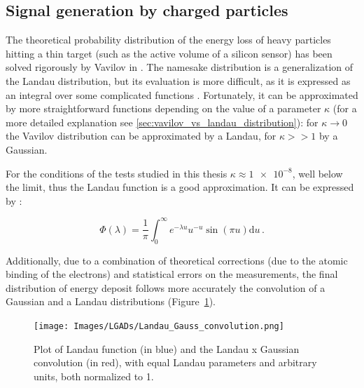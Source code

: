 \subsection{Signal generation by charged particles}\label{subsec:charged_particles_distribution}
The theoretical probability distribution of the energy loss of heavy particles hitting a thin target (such as the active volume of a silicon sensor) has been solved rigorously by Vavilov in \cite{vavilov_1957}. The namesake distribution is a generalization of the Landau distribution, but its evaluation is more difficult, as it is expressed as an integral over some complicated functions \cite[Eq.(4)]{vavilov_1957}. Fortunately, it can be approximated by more straightforward functions depending on the value of a parameter $\kappa$ (for a more detailed explanation see \ref{sec:vavilov_vs_landau_distribution}): for $\kappa\rightarrow0$ the Vavilov distribution can be approximated by a Landau, for $\kappa>>1$ by a Gaussian.

For the conditions of the tests studied in this thesis $\kappa\approx \num{1e-8}$, well below the limit, thus the Landau function is a good approximation. It can be expressed by \cite{KOLBIG198497}:

\begin{equation}\label{eq:landau}
    \Phi (\lambda) = \frac{1}{\pi} \int_{0}^{\infty} e^{-\lambda u} u^{-u} \sin (\pi u ) \mathrm{d}u \, .
\end{equation}

Additionally, due to a combination of theoretical corrections \cite{PhysRevA.11.1286} (due to the atomic binding of the electrons) and statistical errors on the measurements, the final distribution of energy deposit follows more accurately the convolution of a Gaussian and a Landau distributions (Figure~\ref{fig:langau_convolution_plot}).

\begin{figure}
    \centering
    \texttt{[image: Images/LGADs/Landau\_Gauss\_convolution.png]}
    \captionsetup{width=\captionwidth}
    \caption{Plot of Landau function (in blue) and the Landau x Gaussian convolution (in red), with equal Landau parameters and arbitrary units, both normalized to 1.}
    \label{fig:langau_convolution_plot}
\end{figure}

